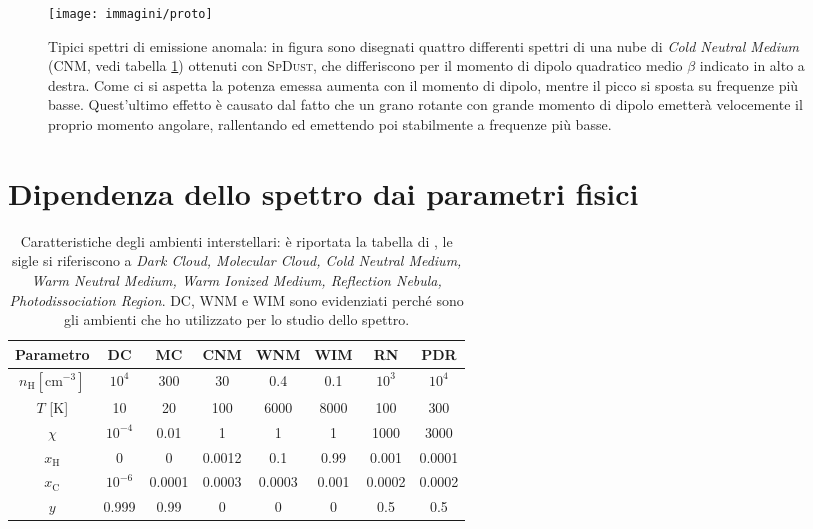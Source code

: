 \begin{figure}
\centering
\texttt{[image: immagini/proto]}
\caption{Tipici spettri di emissione anomala: in figura sono disegnati quattro differenti spettri di una nube di \textit{Cold Neutral Medium} (CNM, vedi tabella \ref{tab1}) ottenuti con \textsc{SpDust}, che differiscono per il momento di dipolo quadratico medio $\beta$ indicato in alto a destra. Come ci si aspetta la potenza emessa aumenta con il momento di dipolo, mentre il picco si sposta su frequenze più basse. Quest'ultimo effetto è causato dal fatto che un grano rotante con grande momento di dipolo emetterà velocemente il proprio momento angolare, rallentando ed emettendo poi stabilmente a frequenze più basse.}
\label{fig:proto}
\end{figure}


\section{Dipendenza dello spettro dai parametri fisici}
\begin{table}[]
	\centering
	\label{tab1}
	\begin{tabular}{c|ccccccc}
		Parametro                         & \textbf{DC}                          & MC     & CNM    & \textbf{WNM}    & \textbf{WIM}   & RN     & PDR    \\ \hline
		$n_{\mathrm{H}} [\text{cm}^{-3}]$ & $10^4$                      & 300    & 30     & 0.4    & 0.1   & $10^3$ & $10^4$ \\
		$T$ {[}K{]}                       & 10                          & 20     & 100    & 6000   & 8000  & 100    & 300    \\
		$\chi$                            & $10^{-4}$                   & 0.01   & 1      & 1      & 1     & 1000   & 3000   \\
		$x_{\mathrm{H}}$                  & 0                           & 0      & 0.0012 & 0.1    & 0.99  & 0.001  & 0.0001 \\
		$x_{\mathrm{C}}$                  & $10^{-6}$ & 0.0001 & 0.0003 & 0.0003 & 0.001 & 0.0002 & 0.0002 \\
		$y$                               & 0.999                       & 0.99   & 0      & 0      & 0     & 0.5    & 0.5   
	\end{tabular}
	\caption{Caratteristiche degli ambienti interstellari: è riportata la tabella di \textcite{DL98b}, le sigle si riferiscono a \textit{Dark Cloud, Molecular Cloud, Cold Neutral Medium, Warm Neutral Medium, Warm Ionized Medium, Reflection Nebula, Photodissociation Region}. DC, WNM e WIM sono evidenziati perché sono gli ambienti che ho utilizzato per lo studio dello spettro.}
	
\end{table}

